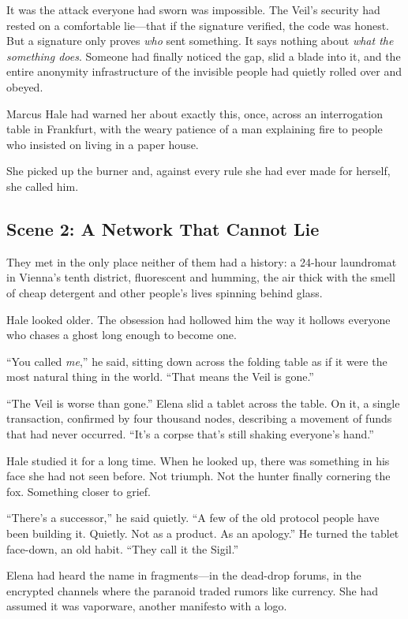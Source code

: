 It was the attack everyone had sworn was impossible. The Veil's security had rested on a comfortable lie---that if the signature verified, the code was honest. But a signature only proves \emph{who} sent something. It says nothing about \emph{what the something does}. Someone had finally noticed the gap, slid a blade into it, and the entire anonymity infrastructure of the invisible people had quietly rolled over and obeyed.

Marcus Hale had warned her about exactly this, once, across an interrogation table in Frankfurt, with the weary patience of a man explaining fire to people who insisted on living in a paper house.

She picked up the burner and, against every rule she had ever made for herself, she called him.

\hypertarget{scene-2-a-network-that-cannot-lie}{%
\subsection{Scene 2: A Network That Cannot Lie}\label{scene-2-a-network-that-cannot-lie}}

They met in the only place neither of them had a history: a 24-hour laundromat in Vienna's tenth district, fluorescent and humming, the air thick with the smell of cheap detergent and other people's lives spinning behind glass.

Hale looked older. The obsession had hollowed him the way it hollows everyone who chases a ghost long enough to become one.

``You called \emph{me},'' he said, sitting down across the folding table as if it were the most natural thing in the world. ``That means the Veil is gone.''

``The Veil is worse than gone.'' Elena slid a tablet across the table. On it, a single transaction, confirmed by four thousand nodes, describing a movement of funds that had never occurred. ``It's a corpse that's still shaking everyone's hand.''

Hale studied it for a long time. When he looked up, there was something in his face she had not seen before. Not triumph. Not the hunter finally cornering the fox. Something closer to grief.

``There's a successor,'' he said quietly. ``A few of the old protocol people have been building it. Quietly. Not as a product. As an apology.'' He turned the tablet face-down, an old habit. ``They call it the Sigil.''

Elena had heard the name in fragments---in the dead-drop forums, in the encrypted channels where the paranoid traded rumors like currency. She had assumed it was vaporware, another manifesto with a logo.

